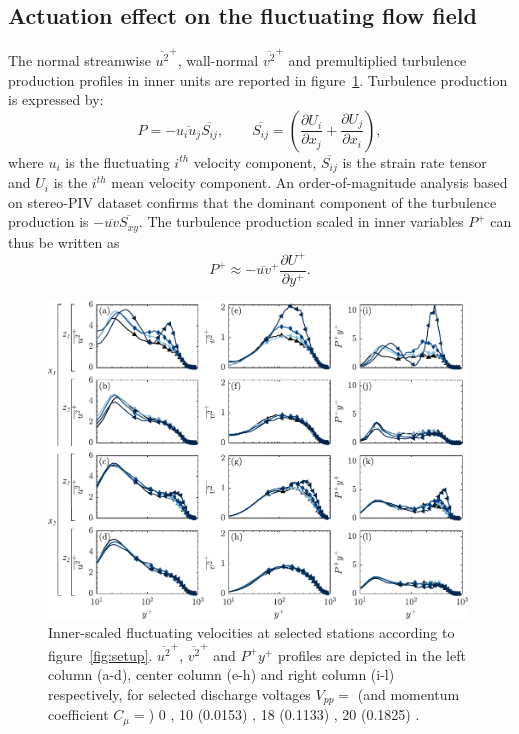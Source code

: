 \subsection{Actuation effect on the fluctuating flow field}
The normal streamwise $\overline{u^2}^+$, wall-normal $\overline{v^2}^+$ and premultiplied turbulence production profiles in inner units are reported in figure~\ref{fig:u2v2Pprofile}. Turbulence production is expressed by:
\begin{equation}
    P = -\overline{u_i u_j}\overline{S_{ij}}, \qquad \overline{S_{ij}} = \left( \frac{\partial U_i}{\partial x_j} + \frac{\partial U_j}{\partial x_i} \right),
     \label{eq:TurbProdFull}
\end{equation}
where $u_i$ is the fluctuating $i^{th}$ velocity component, $\overline{S_{ij}}$ is the strain rate tensor and $U_i$ is the $i^{th}$ mean velocity component. %
An order-of-magnitude analysis based on stereo-PIV dataset confirms that the dominant component of the turbulence production is $-\overline{uv}\overline{S_{xy}}$. The turbulence production scaled in inner variables $P^+$ can thus be written as
\begin{equation}
    P^+ \approx -\overline{uv}^+ \frac{\partial U^+}{\partial y^+}. \label{eq:TurbProdRed}
\end{equation} 
%
\begin{figure} %
    \centering
    \includegraphics[width = 0.99\textwidth]{figures/results/TBL/u2_v2_P_profilesv2}
        \caption{Inner-scaled fluctuating velocities at selected stations according to figure~\ref{fig:setup}. $\overline{u^2}^+$, $\overline{v^2}^+$ and $P^+y^+$ profiles are depicted in the left column (a-d), center column (e-h) and right column (i-l) respectively, for selected discharge voltages $V_{pp}=$ (and momentum coefficient $C_\mu = $) 0 , 10 (0.0153) , 18 (0.1133) , 20 (0.1825) .}
    \label{fig:u2v2Pprofile}
\end{figure}%
